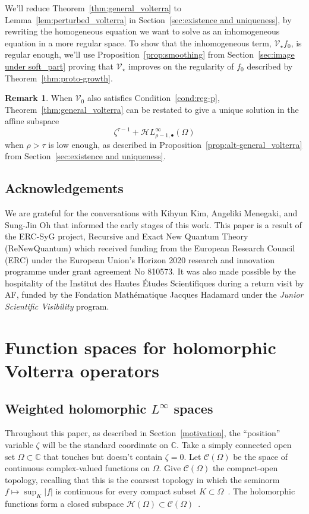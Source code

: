 \documentclass{article}
\theoremstyle{definition}
\newtheorem{rmk}{Remark}
\theoremstyle{plain}
\newcommand{\C}{\mathbb{C}}
\newcommand{\cont}{\mathcal{C}}
\newcommand{\holo}{\mathcal{H}}
\newcommand{\singexp}[2]{\mathcal{H}L^\infty_{#1, #2}}
\newcommand{\singexpalg}[1]{\singexp{#1}{\bullet}}
\newcommand{\hardpart}{\mathcal{V}_0}
\newcommand{\softpart}{\mathcal{V}_\star}
\newcommand{\domain}{\Omega}
\begin{document}
We'll reduce Theorem~\ref{thm:general_volterra} to Lemma~\ref{lem:perturbed_volterra} in Section~\ref{sec:existence and uniqueness}, by rewriting the homogeneous equation we want to solve as an inhomogeneous equation in a more regular space. To show that the inhomogeneous term, $\softpart f_0$, is regular enough, we'll use Proposition~\ref{prop:smoothing} from Section~\ref{sec:image under soft_part} proving that $\softpart$ improves on the regularity of $f_0$ described by Theorem~\ref{thm:proto-growth}.
\begin{rmk}
When $\hardpart$ also satisfies Condition~\eqref{cond:reg-p}, Theorem~\ref{thm:general_volterra} can be restated to give a unique solution in the affine subspace
\[ \zeta^{\tau-1} + \singexpalg{\rho-1}(\domain) \]
when $\rho > \tau$ is low enough, as described in Proposition~\ref{prop:alt-general_volterra} from Section~\ref{sec:existence and uniqueness}.
\end{rmk}
\subsection{Acknowledgements}
We are grateful for the conversations with Kihyun Kim, Angeliki Menegaki, and Sung-Jin Oh that informed the early stages of this work. This paper is a result of the ERC-SyG project, Recursive and Exact New Quantum Theory (ReNewQuantum) which received funding from the European Research Council (ERC) under the European Union's Horizon 2020 research and innovation programme under grant agreement No 810573. It was also made possible by the hospitality of the Institut des Hautes \'{E}tudes Scientifiques during a return visit by AF, funded by the Fondation Math\'{e}matique Jacques Hadamard under the \textit{Junior Scientific Visibility} program.
\section{Function spaces for holomorphic Volterra operators}\label{fn-spaces}
\subsection{Weighted holomorphic $L^{\infty}$ spaces}\label{sec:fn-space-defs}
Throughout this paper, as described in Section~\ref{motivation}, the ``position'' variable $\zeta$ will be the standard coordinate on $\C$. Take a simply connected open set $\domain \subset \C$ that touches but doesn't contain $\zeta = 0$. Let $\cont(\domain)$ be the space of continuous complex-valued functions on $\domain$. Give $\cont(\domain)$ the compact-open topology, recalling that this is the coarsest topology in which the seminorm $f \mapsto \sup_K |f|$ is continuous for every compact subset $K \subset \domain$~\cite[Example~2.6 and Section~4 notes]{fnl-cpx-anal}. The holomorphic functions form a closed subspace $\holo(\domain) \subset \cont(\domain)$~\cite[Proposition~3.14]{fnl-cpx-anal}.
\end{document}
